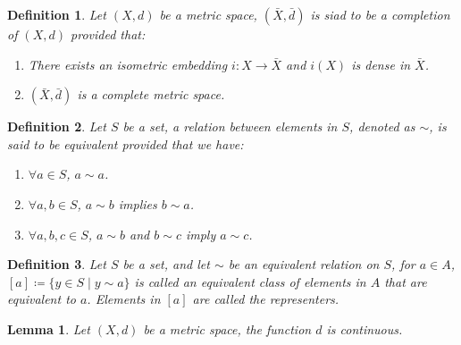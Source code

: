 \documentclass[11pt]{book}
\theoremstyle{break}
\theoremstyle{break}
\newtheorem{lem}{Lemma}[thm]
\newtheorem{defn}{Definition}[corL]
\begin{document}
\begin{defn}
Let $(X,d)$ be a metric space, $(\bar{X}, \bar{d})$ is siad to be a completion of $(X,d)$ provided that:
\begin{enumerate}[topsep=3pt,itemsep=-1ex,partopsep=1ex,parsep=1ex]
\item There exists an isometric embedding $i:X \to \bar{X}$ and $i(X)$ is dense in $\bar{X}$.
\item $(\bar{X}, \bar{d})$ is a complete metric space.
\end{enumerate}
\end{defn}

\begin{defn}
Let $S$ be a set, a relation between elements in $S$, denoted as $\sim$, is said to be equivalent provided that we have:
\begin{enumerate}[topsep=3pt,itemsep=-1ex,partopsep=1ex,parsep=1ex]
\item $\forall a \in S$, $a\sim a$.
\item $\forall a,b \in S$, $a\sim b $ implies $b\sim a$.
\item $\forall a,b,c \in S$, $a\sim b$ and $b\sim c$ imply $a\sim c$.
\end{enumerate}
\end{defn}

\begin{defn}
Let $S$ be a set, and let $\sim$ be an equivalent relation on $S$, for $a \in A$, $[a]\coloneqq \{ y \in S \mid y \sim a\}$ is called an equivalent class of elements in $A$ that are equivalent to $a$. Elements in $[a]$ are called the representers. 
\end{defn}

\begin{lem}
Let $(X,d)$ be a metric space, the function $d$ is continuous. 
\end{lem}
\end{document}
